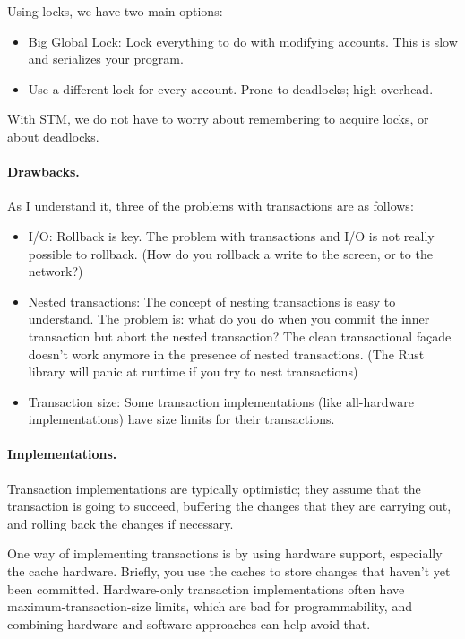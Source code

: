 \documentclass[a4paper]{report}
\begin{document}
Using locks, we have two main options:
      \begin{itemize}
        \item Big Global Lock: Lock everything to do with modifying accounts. This is slow and serializes your program.
        \item Use a different lock for every account. Prone to deadlocks; high overhead.
      \end{itemize}
With STM, we do not have to worry about remembering to acquire locks,
or about deadlocks.

\paragraph{Drawbacks.} As I understand it, three of the problems with 
transactions are as follows:

\begin{itemize}
\item I/O: Rollback is key. The problem with transactions and I/O is
  not really possible to rollback. (How do you rollback a write to the
  screen, or to the network?)

\item Nested transactions: The concept of nesting transactions is easy
  to understand. The problem is: what do you do when you commit the
  inner transaction but abort the nested transaction? The clean
  transactional fa\c{c}ade doesn't work anymore in the presence of
  nested transactions. (The Rust library will panic at runtime if you try to nest transactions)

\item Transaction size: Some transaction implementations (like
  all-hardware implementations) have size limits for their
  transactions.
\end{itemize}

\paragraph{Implementations.} Transaction implementations are typically 
optimistic; they assume that the transaction is going to succeed,
buffering the changes that they are carrying out, and rolling back the
changes if necessary.

One way of implementing transactions is by using hardware support,
especially the cache hardware. Briefly, you use the caches to store
changes that haven't yet been committed. Hardware-only transaction
implementations often have maximum-transaction-size limits, which are
bad for programmability, and combining hardware and software approaches
can help avoid that.
\end{document}
